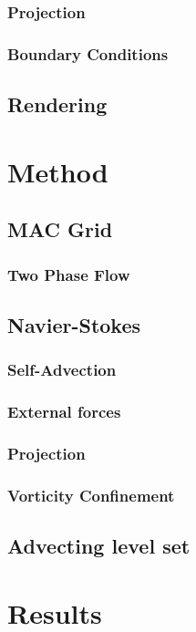 \documentclass[]{report}   %
\begin{document}
\subsection{Projection}

\subsection{Boundary Conditions}

\section{Rendering}


\chapter{Method}
\section{MAC Grid}

\subsection{Two Phase Flow}

\section{Navier-Stokes}
\subsection{Self-Advection}

\subsection{External forces}

\subsection{Projection}

\subsection{Vorticity Confinement}

\section{Advecting level set}


\chapter{Results}



\endgroup



\end{document}
